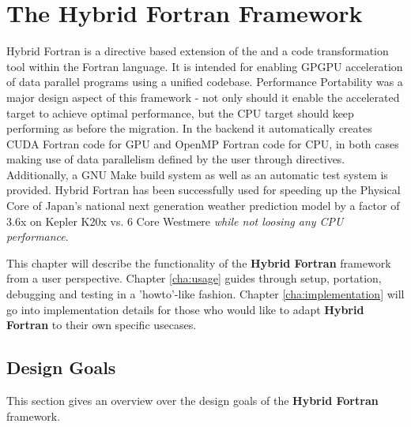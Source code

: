\chapter{The Hybrid Fortran Framework} \label{cha:framework}
Hybrid Fortran is a directive based extension of the and a code transformation tool within the Fortran language. It is intended for enabling GPGPU acceleration of data parallel programs using a unified codebase. Performance Portability was a major design aspect of this framework - not only should it enable the accelerated target to achieve optimal performance, but the CPU target should keep performing as before the migration. In the backend it automatically creates CUDA Fortran code for GPU and OpenMP Fortran code for CPU, in both cases making use of data parallelism defined by the user through directives. Additionally, a GNU Make build system as well as an automatic test system is provided. Hybrid Fortran has been successfully used for speeding up the Physical Core of Japan's national next generation weather prediction model by a factor of 3.6x on Kepler K20x vs. 6 Core Westmere \textit{while not loosing any CPU performance}.

This chapter will describe the functionality of the \textbf{Hybrid Fortran} framework from a user perspective. Chapter \ref{cha:usage} guides through setup, portation, debugging and testing in a 'howto'-like fashion. Chapter \ref{cha:implementation} will go into implementation details for those who would like to adapt \textbf{Hybrid Fortran} to their own specific usecases.

\section{Design Goals} \label{sec:frameworkGoals}

This section gives an overview over the design goals of the \textbf{Hybrid Fortran} framework.

